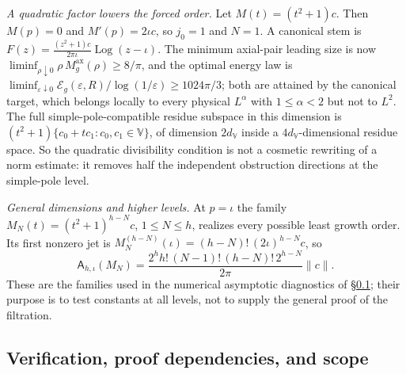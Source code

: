 \documentclass[11pt,a4paper]{article}
\numberwithin{equation}{section}
\theoremstyle{definition}
\theoremstyle{remark}
\theoremstyle{plain}
\newcommand{\Max}{M^{\mathrm{ax}}}                    %
\newcommand{\Eg}{\mathcal E_{g}}
\newcommand{\norm}[1]{\lVert #1\rVert}
\newcommand{\VV}{\mathbb V}                       %
\newcommand{\dV}{d_{\VV}}                         %
\begin{document}
\emph{A quadratic factor lowers the forced order.} Let $M(t)=(t^2+1)c$. Then
$M(p)=0$ and $M'(p)=2\iota c$, so $j_0=1$ and $N=1$. A canonical stem is
$F(z)=\frac{(z^2+1)c}{2\pi\iota}\operatorname{Log}(z-\iota)$. The minimum
axial-pair leading size is now $\liminf_{\rho\downarrow0}\rho\,\Max_g(\rho)\ge
8/\pi$, and the optimal energy law is
$\liminf_{\varepsilon\downarrow0}\Eg(\varepsilon,R)/\log(1/\varepsilon)\ge
1024\pi/3$; both are attained by the canonical target, which belongs locally to
every physical $L^\alpha$ with $1\le\alpha<2$ but not to $L^2$. The full
simple-pole-compatible residue subspace in this dimension is
$(t^2+1)\{c_0+tc_1:c_0,c_1\in\VV\}$, of dimension $2\dV$ inside a
$4\dV$-dimensional residue space. So the quadratic divisibility condition is
not a cosmetic rewriting of a norm estimate: it removes half the independent
obstruction directions at the simple-pole level.

\emph{General dimensions and higher levels.} At $p=\iota$ the family
$M_N(t)=(t^2+1)^{h-N}c$, $1\le N\le h$, realizes every possible least growth
order. Its first nonzero jet is $M_N^{(h-N)}(\iota)=(h-N)!\,(2\iota)^{h-N}c$,
so
\[
 \mathsf A_{h,\iota}(M_N)=\frac{2^hh!\,(N-1)!\,(h-N)!\,2^{h-N}}{2\pi}\norm c .
\]
These are the families used in the numerical asymptotic diagnostics of
\S\ref{g:sub:verification}; their purpose is to test constants at all levels,
not to supply the general proof of the filtration.

\subsection{Verification, proof dependencies, and scope}
\label{g:sub:verification}
\end{document}
